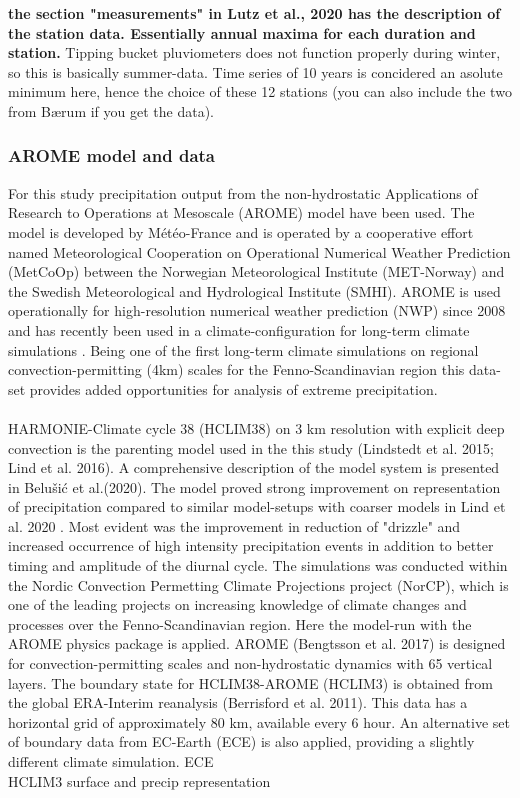 \textbf{the section "measurements" in Lutz et al., 2020 has the description of the station data. Essentially annual maxima for each duration and station.} Tipping bucket pluviometers does not function properly during winter, so this is basically summer-data. Time series of 10 years is concidered an asolute minimum here, hence the choice of these 12 stations (you can also include the two from Bærum if you get the data). 

\subsubsection{AROME model and data}

For this study precipitation output from the non-hydrostatic Applications of Research to Operations at Mesoscale (AROME)\cite{seity_arome} model have been used. The model is developed by Météo-France and is operated by a cooperative effort named Meteorological Cooperation on Operational Numerical Weather Prediction (MetCoOp) between the Norwegian Meteorological Institute (MET-Norway) and the Swedish Meteorological and Hydrological Institute (SMHI). AROME is used operationally for high-resolution numerical weather prediction (NWP) since 2008 and has recently been used in a climate-configuration for long-term climate simulations \cite{lind_arome]}. Being one of the first long-term climate simulations on regional convection-permitting (\<4km) scales for the Fenno-Scandinavian region this data-set provides added opportunities for analysis of extreme precipitation.  
\\
\\
HARMONIE-Climate cycle 38 (HCLIM38) on 3 km resolution with explicit deep convection is the parenting model used in the this study (Lindstedt et al. 2015\cite{lindstedt_hclim}; Lind et al. 2016\cite{lind_hclim}). A comprehensive description of the model system is presented in Belušić et al.(2020)\cite{belusic_hclim}. The model proved strong improvement on representation of precipitation compared to similar model-setups with coarser models in Lind et al. 2020 \cite{lind_arome}. Most evident was the improvement in reduction of "drizzle" and increased occurrence of high intensity precipitation events in addition to better timing and amplitude of the diurnal cycle. The simulations was conducted within the Nordic Convection Permetting Climate Projections project (NorCP), which is one of the leading projects on increasing knowledge of climate changes and processes over the Fenno-Scandinavian region. Here the model-run with the AROME physics package is applied. AROME (Bengtsson et al. 2017)\cite{bengtsson_arome} is designed for convection-permitting scales and non-hydrostatic dynamics with 65 vertical layers. The boundary state for HCLIM38-AROME (HCLIM3) is obtained from the global ERA-Interim reanalysis (Berrisford et al. 2011)\cite{erai}. This data has a horizontal grid of approximately 80 km, available every 6 hour. An alternative set of boundary data from EC-Earth (ECE) is also applied, providing a slightly different climate simulation.    
ECE
\\
HCLIM3
surface and precip representation

